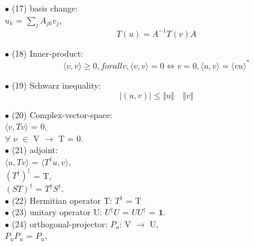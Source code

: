 \documentclass[a4paper, 10pt, onepage]{elegantbook}
\begin{document}
{$\bullet$ (17) basis change:  \\

$u_k$ = $\sum_j A_{jk}v_j$,\\
\begin{equation}
T({u}) = A^{-1} T ({v}) A
\end{equation}

$\bullet$ (18) Inner-product:  \\

\begin{equation} \label{eq:Inner-Product}
\langle{v,v} \rangle \geq 0, for all v, \langle{v,v} \rangle = 0 \iff v = 0, \langle{u,v} \rangle = \langle{vu} \rangle^*
\end{equation}

$\bullet$ (19) Schwarz inequality:  \\
\begin{equation}
\mid (u,v) \mid \leq \Vert u \Vert \quad  \Vert v \Vert
\end{equation}

$\bullet$ (20) Complex-vector-space:  \\

$\langle v,Tv \rangle$ = 0,  \\

$\forall$ $\nu$ $\in$ V $\longrightarrow$ T = 0.  \\

$\bullet$ (21) adjoint: \\

$\langle{u,Tv} \rangle$ = $\langle T^\dagger{u,v} \rangle$,  \\

$(T^\dagger)^\dagger$ = T,  \\

$(ST)^\dagger$ = $T^\dagger S^\dagger$. \\

$\bullet$ (22) Hermitian operator T: $T^\dagger$ = T \\ 

$\bullet$ (23) unitary operator U: $U^\dagger U$ = $UU^\dagger$ = $\mathbf{1}$.  \\

$\bullet$ (24) orthogonal-projector: $P_u$: V $\longrightarrow$ U,  \\

${P_uP_u}$ = $P_u$, \\

}
\end{document}
